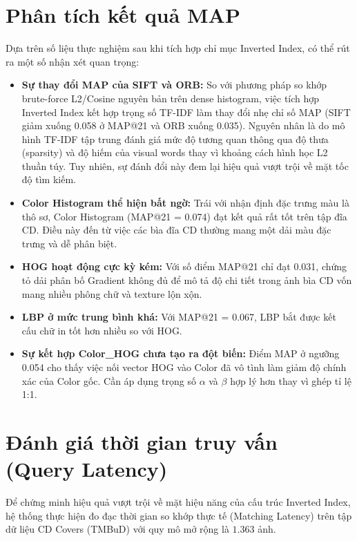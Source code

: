 \section{Phân tích kết quả MAP}
Dựa trên số liệu thực nghiệm sau khi tích hợp chỉ mục Inverted Index, có thể rút ra một số nhận xét quan trọng:
\begin{itemize}
    \item \textbf{Sự thay đổi MAP của SIFT và ORB:} So với phương pháp so khớp brute-force L2/Cosine nguyên bản trên dense histogram, việc tích hợp Inverted Index kết hợp trọng số TF-IDF làm thay đổi nhẹ chỉ số MAP (SIFT giảm xuống 0.058 ở MAP@21 và ORB xuống 0.035). Nguyên nhân là do mô hình TF-IDF tập trung đánh giá mức độ tương quan thông qua độ thưa (sparsity) và độ hiếm của visual words thay vì khoảng cách hình học L2 thuần túy. Tuy nhiên, sự đánh đổi này đem lại hiệu quả vượt trội về mặt tốc độ tìm kiếm.
    \item \textbf{Color Histogram thể hiện bất ngờ:} Trái với nhận định đặc trưng màu là thô sơ, Color Histogram (MAP@21 = 0.074) đạt kết quả rất tốt trên tập đĩa CD. Điều này đến từ việc các bìa đĩa CD thường mang một dải màu đặc trưng và dễ phân biệt.
    \item \textbf{HOG hoạt động cực kỳ kém:} Với số điểm MAP@21 chỉ đạt 0.031, chứng tỏ dải phân bố Gradient không đủ để mô tả độ chi tiết trong ảnh bìa CD vốn mang nhiều phông chữ và texture lộn xộn.
    \item \textbf{LBP ở mức trung bình khá:} Với MAP@21 = 0.067, LBP bắt được kết cấu chữ in tốt hơn nhiều so với HOG.
    \item \textbf{Sự kết hợp Color\_HOG chưa tạo ra đột biến:} Điểm MAP ở ngưỡng 0.054 cho thấy việc nối vector HOG vào Color đã vô tình làm giảm độ chính xác của Color gốc. Cần áp dụng trọng số $\alpha$ và $\beta$ hợp lý hơn thay vì ghép tỉ lệ 1:1.
\end{itemize}

\section{Đánh giá thời gian truy vấn (Query Latency)}
Để chứng minh hiệu quả vượt trội về mặt hiệu năng của cấu trúc Inverted Index, hệ thống thực hiện đo đạc thời gian so khớp thực tế (Matching Latency) trên tập dữ liệu CD Covers (TMBuD) với quy mô mở rộng là $1.363$ ảnh.

